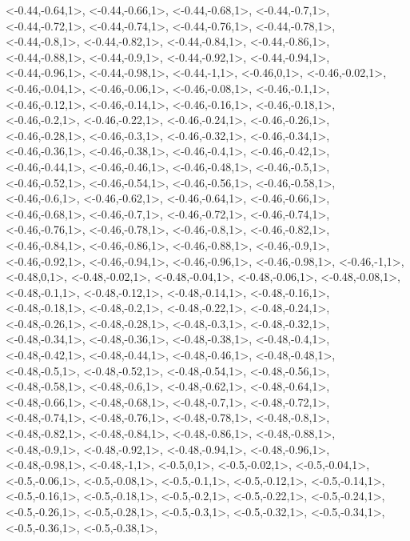 \documentclass[a4paper,10pt]{article}
\begin{document}
\begin{eulernotebook}
\begin{euleroutput}
  <-0.44,-0.64,1>,
  <-0.44,-0.66,1>,
  <-0.44,-0.68,1>,
  <-0.44,-0.7,1>,
  <-0.44,-0.72,1>,
  <-0.44,-0.74,1>,
  <-0.44,-0.76,1>,
  <-0.44,-0.78,1>,
  <-0.44,-0.8,1>,
  <-0.44,-0.82,1>,
  <-0.44,-0.84,1>,
  <-0.44,-0.86,1>,
  <-0.44,-0.88,1>,
  <-0.44,-0.9,1>,
  <-0.44,-0.92,1>,
  <-0.44,-0.94,1>,
  <-0.44,-0.96,1>,
  <-0.44,-0.98,1>,
  <-0.44,-1,1>,
  <-0.46,0,1>,
  <-0.46,-0.02,1>,
  <-0.46,-0.04,1>,
  <-0.46,-0.06,1>,
  <-0.46,-0.08,1>,
  <-0.46,-0.1,1>,
  <-0.46,-0.12,1>,
  <-0.46,-0.14,1>,
  <-0.46,-0.16,1>,
  <-0.46,-0.18,1>,
  <-0.46,-0.2,1>,
  <-0.46,-0.22,1>,
  <-0.46,-0.24,1>,
  <-0.46,-0.26,1>,
  <-0.46,-0.28,1>,
  <-0.46,-0.3,1>,
  <-0.46,-0.32,1>,
  <-0.46,-0.34,1>,
  <-0.46,-0.36,1>,
  <-0.46,-0.38,1>,
  <-0.46,-0.4,1>,
  <-0.46,-0.42,1>,
  <-0.46,-0.44,1>,
  <-0.46,-0.46,1>,
  <-0.46,-0.48,1>,
  <-0.46,-0.5,1>,
  <-0.46,-0.52,1>,
  <-0.46,-0.54,1>,
  <-0.46,-0.56,1>,
  <-0.46,-0.58,1>,
  <-0.46,-0.6,1>,
  <-0.46,-0.62,1>,
  <-0.46,-0.64,1>,
  <-0.46,-0.66,1>,
  <-0.46,-0.68,1>,
  <-0.46,-0.7,1>,
  <-0.46,-0.72,1>,
  <-0.46,-0.74,1>,
  <-0.46,-0.76,1>,
  <-0.46,-0.78,1>,
  <-0.46,-0.8,1>,
  <-0.46,-0.82,1>,
  <-0.46,-0.84,1>,
  <-0.46,-0.86,1>,
  <-0.46,-0.88,1>,
  <-0.46,-0.9,1>,
  <-0.46,-0.92,1>,
  <-0.46,-0.94,1>,
  <-0.46,-0.96,1>,
  <-0.46,-0.98,1>,
  <-0.46,-1,1>,
  <-0.48,0,1>,
  <-0.48,-0.02,1>,
  <-0.48,-0.04,1>,
  <-0.48,-0.06,1>,
  <-0.48,-0.08,1>,
  <-0.48,-0.1,1>,
  <-0.48,-0.12,1>,
  <-0.48,-0.14,1>,
  <-0.48,-0.16,1>,
  <-0.48,-0.18,1>,
  <-0.48,-0.2,1>,
  <-0.48,-0.22,1>,
  <-0.48,-0.24,1>,
  <-0.48,-0.26,1>,
  <-0.48,-0.28,1>,
  <-0.48,-0.3,1>,
  <-0.48,-0.32,1>,
  <-0.48,-0.34,1>,
  <-0.48,-0.36,1>,
  <-0.48,-0.38,1>,
  <-0.48,-0.4,1>,
  <-0.48,-0.42,1>,
  <-0.48,-0.44,1>,
  <-0.48,-0.46,1>,
  <-0.48,-0.48,1>,
  <-0.48,-0.5,1>,
  <-0.48,-0.52,1>,
  <-0.48,-0.54,1>,
  <-0.48,-0.56,1>,
  <-0.48,-0.58,1>,
  <-0.48,-0.6,1>,
  <-0.48,-0.62,1>,
  <-0.48,-0.64,1>,
  <-0.48,-0.66,1>,
  <-0.48,-0.68,1>,
  <-0.48,-0.7,1>,
  <-0.48,-0.72,1>,
  <-0.48,-0.74,1>,
  <-0.48,-0.76,1>,
  <-0.48,-0.78,1>,
  <-0.48,-0.8,1>,
  <-0.48,-0.82,1>,
  <-0.48,-0.84,1>,
  <-0.48,-0.86,1>,
  <-0.48,-0.88,1>,
  <-0.48,-0.9,1>,
  <-0.48,-0.92,1>,
  <-0.48,-0.94,1>,
  <-0.48,-0.96,1>,
  <-0.48,-0.98,1>,
  <-0.48,-1,1>,
  <-0.5,0,1>,
  <-0.5,-0.02,1>,
  <-0.5,-0.04,1>,
  <-0.5,-0.06,1>,
  <-0.5,-0.08,1>,
  <-0.5,-0.1,1>,
  <-0.5,-0.12,1>,
  <-0.5,-0.14,1>,
  <-0.5,-0.16,1>,
  <-0.5,-0.18,1>,
  <-0.5,-0.2,1>,
  <-0.5,-0.22,1>,
  <-0.5,-0.24,1>,
  <-0.5,-0.26,1>,
  <-0.5,-0.28,1>,
  <-0.5,-0.3,1>,
  <-0.5,-0.32,1>,
  <-0.5,-0.34,1>,
  <-0.5,-0.36,1>,
  <-0.5,-0.38,1>,

\end{euleroutput}
\end{eulernotebook}
\end{document}
